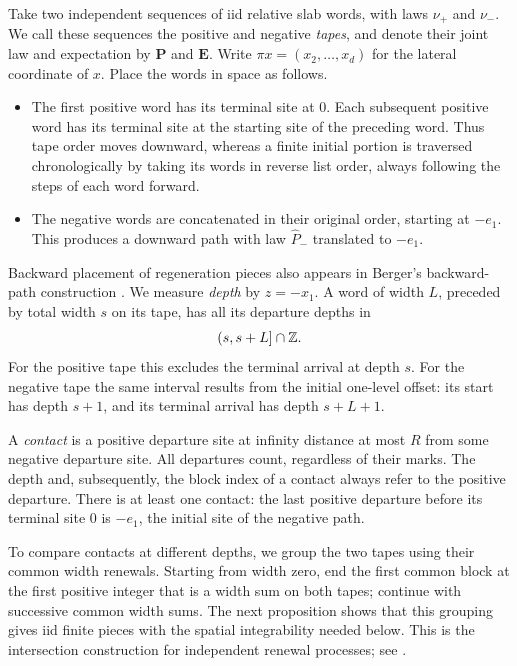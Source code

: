 Take two independent sequences of iid relative slab words, with laws
$\nu_+$ and $\nu_-$. We call these sequences the positive and negative
\emph{tapes}, and denote their joint law and expectation by
$\mathbf P$ and $\mathbf E$. Write
$\pi x=(x_2,\ldots,x_d)$ for the lateral coordinate of $x$.
Place the words in space as follows.
\begin{itemize}[leftmargin=*,itemsep=3pt]
\item The first positive word has its terminal site at $0$. Each
subsequent positive word has its terminal site at the starting site of
the preceding word. Thus tape order moves downward, whereas a finite
initial portion is traversed chronologically by taking its words in
reverse list order, always following the steps of each word forward.
\item The negative words are concatenated in their original order,
starting at $-e_1$. This produces a downward path with law
$\widehat P_-$ translated to $-e_1$.
\end{itemize}
Backward placement of regeneration pieces also appears in Berger's
backward-path construction \cite[Sections~2--3]{Berger2008}.
We measure \emph{depth} by $z=-x_1$. A word of width $L$, preceded by
total width $s$ on its tape, has all its departure depths in
\begin{equation}
                    (s,s+L]\cap\mathbb Z.
 \label{eq:departure-depths}
\end{equation}
For the positive tape this excludes the terminal arrival at depth $s$.
For the negative tape the same interval results from the initial
one-level offset: its start has depth $s+1$, and its terminal arrival has
depth $s+L+1$.

A \emph{contact} is a positive departure site at infinity distance at
most $R$ from some negative departure site. All departures count,
regardless of their marks. The depth and, subsequently, the block index
of a contact always refer to the positive departure. There is at least
one contact: the last positive departure before its terminal site $0$
is $-e_1$, the initial site of the negative path.

To compare contacts at different depths, we group the two tapes using
their common width renewals. Starting from width zero, end the first
common block at the first positive integer that is a width sum on both
tapes; continue with successive common width sums. The next proposition
shows that this grouping gives iid finite pieces with the spatial
integrability needed below. This is the intersection construction for
independent renewal processes; see \cite{AlexanderBerger2016}.

